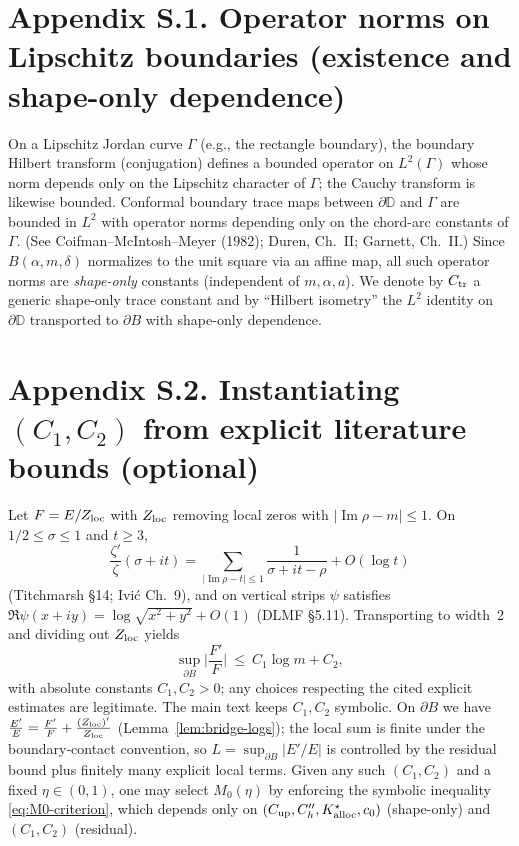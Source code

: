 \documentclass[11pt]{article}
\numberwithin{equation}{section}
\theoremstyle{remark}
\newcommand{\D}{\mathbb{D}}
\DeclareMathOperator{\Imag}{Im}
\begin{document}
\section*{Appendix S.1. Operator norms on Lipschitz boundaries (existence and shape-only dependence)}\label{app:S1} %
On a Lipschitz Jordan curve $\Gamma$ (e.g., the rectangle boundary), the boundary Hilbert transform (conjugation) defines a bounded operator on $L^2(\Gamma)$ whose norm depends only on the Lipschitz character of $\Gamma$; the Cauchy transform is likewise bounded. Conformal boundary trace maps between $\partial\D$ and $\Gamma$ are bounded in $L^2$ with operator norms depending only on the chord-arc constants of $\Gamma$. (See Coifman--McIntosh--Meyer (1982); Duren, Ch.~II; Garnett, Ch.~II.)
Since $B(\alpha,m,\delta)$ normalizes to the unit square via an affine map, all such operator norms are \emph{shape-only} constants (independent of $m,\alpha,a$). We denote by $C_{\rm tr}$ a generic shape-only trace constant and by “Hilbert isometry” the $L^2$ identity on $\partial\D$ transported to $\partial B$ with shape-only dependence.

\section*{Appendix S.2. Instantiating $(C_1,C_2)$ from explicit literature bounds (optional)}\label{app:S2} %
Let $F=E/Z_{\rm loc}$ with $Z_{\rm loc}$ removing local zeros with $|\Imag\rho-m|\le 1$. On $1/2\le\sigma\le 1$ and $t\ge 3$,
\[
\frac{\zeta'}{\zeta}(\sigma+it)=\sum_{|\Imag\rho-t|\le 1}\frac{1}{\sigma+it-\rho}+O(\log t)
\]
(Titchmarsh §14; Ivi\'c Ch.~9), and on vertical strips $\psi$ satisfies $\Re\psi(x+iy)=\log\sqrt{x^2+y^2}+O(1)$ (DLMF §5.11). Transporting to width~2 and dividing out $Z_{\rm loc}$ yields
\[
\sup_{\partial B}\Big|\frac{F'}{F}\Big|\ \le\ C_1\log m + C_2,
\]
with absolute constants $C_1,C_2>0$; any choices respecting the cited explicit estimates are legitimate. The main text keeps $C_1,C_2$ symbolic.
On $\partial B$ we have $\frac{E'}{E}=\frac{F'}{F}+\frac{(Z_{\rm loc})'}{Z_{\rm loc}}$ (Lemma~\ref{lem:bridge-logs}); the local sum is finite under the boundary‑contact convention, so $L=\sup_{\partial B}|E'/E|$ is controlled by the residual bound plus finitely many explicit local terms.
Given any such $(C_1,C_2)$ and a fixed $\eta\in(0,1)$, one may select $M_0(\eta)$ by enforcing the symbolic inequality \eqref{eq:M0-criterion}, which depends only on $(C_{\mathrm{up}},C_h'',K_{\rm alloc}^{\star},c_0)$ (shape-only) and $(C_1,C_2)$ (residual). %
\end{document}
